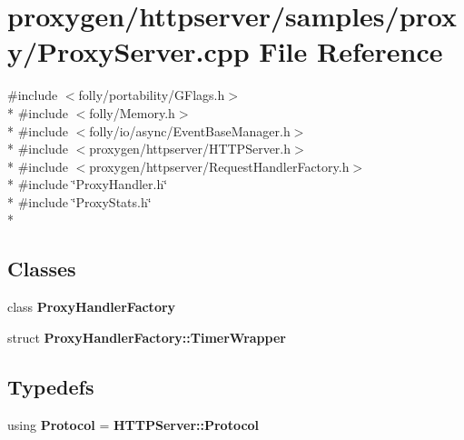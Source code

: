 \section{proxygen/httpserver/samples/proxy/\+Proxy\+Server.cpp File Reference}
\label{ProxyServer_8cpp}
{\ttfamily \#include $<$folly/portability/\+G\+Flags.\+h$>$}\\*
{\ttfamily \#include $<$folly/\+Memory.\+h$>$}\\*
{\ttfamily \#include $<$folly/io/async/\+Event\+Base\+Manager.\+h$>$}\\*
{\ttfamily \#include $<$proxygen/httpserver/\+H\+T\+T\+P\+Server.\+h$>$}\\*
{\ttfamily \#include $<$proxygen/httpserver/\+Request\+Handler\+Factory.\+h$>$}\\*
{\ttfamily \#include \char`\"{}Proxy\+Handler.\+h\char`\"{}}\\*
{\ttfamily \#include \char`\"{}Proxy\+Stats.\+h\char`\"{}}\\*
\subsection*{Classes}
\begin{DoxyCompactItemize}
\item 
class {\bf Proxy\+Handler\+Factory}
\item 
struct {\bf Proxy\+Handler\+Factory\+::\+Timer\+Wrapper}
\end{DoxyCompactItemize}
\subsection*{Typedefs}
\begin{DoxyCompactItemize}
\item 
using {\bf Protocol} = {\bf H\+T\+T\+P\+Server\+::\+Protocol}
\end{DoxyCompactItemize}
